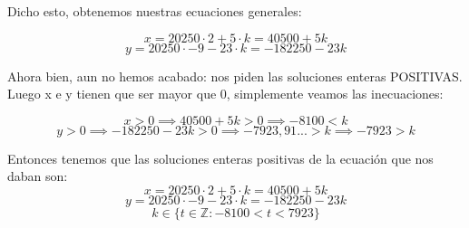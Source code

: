 \documentclass[11pt, a4paper, titlepage]{article}
\theoremstyle{theorem-style}
\theoremstyle{definition-style}
\theoremstyle{remark-style}
\theoremstyle{example-style}
\begin{document}
Dicho esto, obtenemos nuestras ecuaciones generales:

$$ x = 20250 \cdot 2 + 5 \cdot k = 40500 + 5k $$
$$ y = 20250 \cdot -9 - 23 \cdot k = -182250 - 23k $$

Ahora bien, aun no hemos acabado: nos piden las soluciones enteras POSITIVAS. Luego x e y tienen que ser mayor que 0, simplemente veamos las inecuaciones:

$$ x > 0 \implies 40500 + 5k > 0 \implies -8100 < k$$
$$ y > 0 \implies -182250 - 23k > 0 \implies -7923,91... > k \implies -7923 > k $$

Entonces tenemos que las soluciones enteras positivas de la ecuación que nos daban son:
$$ x = 20250 \cdot 2 + 5 \cdot k = 40500 + 5k $$
$$ y = 20250 \cdot -9 - 23 \cdot k = -182250 - 23k $$
$$ k \in \{ t \in \mathbb{Z} : -8100 < t < 7923 \} $$
\end{document}
